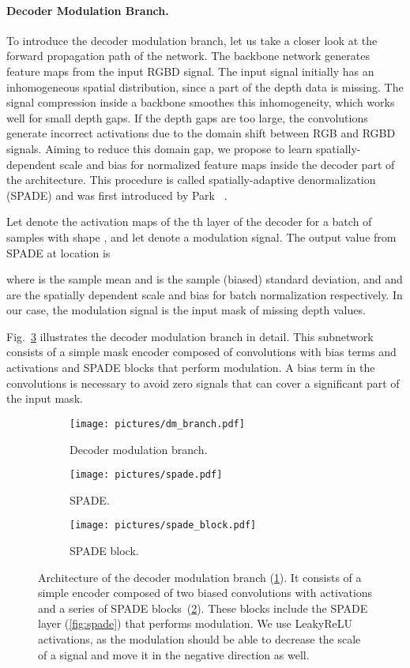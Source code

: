 \documentclass[final]{cvpr}
\begin{document}
    \paragraph{Decoder Modulation Branch.}\label{par:decoder_modulation_branch}
    To introduce the decoder modulation branch, let us take a closer look at the forward propagation path of the network. The backbone network generates feature maps from the input RGBD signal. The input signal initially has an inhomogeneous spatial distribution, since a part of the depth data is missing. The signal compression inside a backbone smoothes this inhomogeneity, which works well for small depth gaps. If the depth gaps are too large, the convolutions generate incorrect activations due to the domain shift between RGB and RGBD signals. Aiming to reduce this domain gap, we propose to learn spatially-dependent scale and bias for normalized feature maps inside the decoder part of the architecture. This procedure is called spatially-adaptive denormalization (SPADE) and was first introduced by Park \etal~\cite{spade}.
    
    Let  denote the activation maps of the th layer of the decoder for a batch of  samples with shape , and let  denote a modulation signal. The output value from SPADE  at location  is

    where  is the sample mean and  is the sample (biased) standard deviation, and  and  are the spatially dependent scale and bias for batch normalization respectively. In our case, the modulation signal  is the input mask of missing depth values. 
    
    Fig.~\ref{fig:dm} illustrates the decoder modulation branch in detail. This subnetwork consists of a simple mask encoder composed of convolutions with bias terms and activations and SPADE blocks that perform modulation. A bias term in the convolutions is necessary to avoid zero signals that can cover a significant part of the input mask.
    
    \begin{figure}[t]
      \centering
      \begin{subfigure}[b]{0.5\linewidth}
        \texttt{[image: pictures/dm\_branch.pdf]}
        \caption{Decoder modulation branch.}
        \label{fig:dm-impl}
      \end{subfigure}
      \begin{subfigure}[b]{0.4\linewidth}
        \centering
        \texttt{[image: pictures/spade.pdf]}
        \caption{SPADE.}
        \label{fig:spade}
        \centering
        \texttt{[image: pictures/spade\_block.pdf]}
        \caption{SPADE block.}
        \label{fig:spade-bl}
      \end{subfigure}
      \caption{Architecture of the decoder modulation branch (\ref{fig:dm-impl}). It consists of a simple encoder composed of two biased convolutions with activations and a series of SPADE blocks~(\ref{fig:spade-bl}). These blocks include the SPADE layer (\ref{fig:spade}) that performs modulation. We use LeakyReLU activations, as the modulation should be able to decrease the scale of a signal and move it in the negative direction as well.}
\label{fig:dm}
    \end{figure}
    
\end{document}
